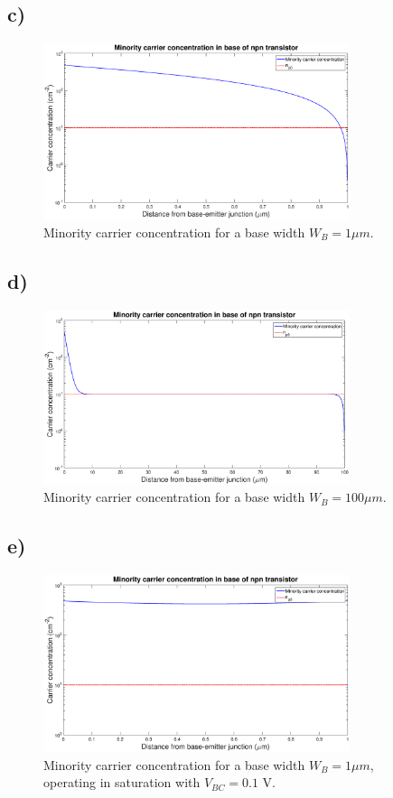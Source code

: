 \subsection*{c)}
	\begin{figure}[htbp!]
		\centering
		\includegraphics[width=0.8\textwidth]{./img/3c}
		\caption{Minority carrier concentration for a base width $W_B = 1 \mu m$.}
	\end{figure}
\subsection*{d)}
	\begin{figure}[htbp!]
		\centering
		\includegraphics[width=0.8\textwidth]{./img/3d}
		\caption{Minority carrier concentration for a base width $W_B = 100 \mu m$.}
	\end{figure}
\subsection*{e)}
	\begin{figure}[htbp!]
		\centering
		\includegraphics[width=0.8\textwidth]{./img/3e}
		\caption{Minority carrier concentration for a base width $W_B = 1 \mu m$, operating in saturation with $V_{BC} = 0.1 \textrm{ V}$.}
	\end{figure}